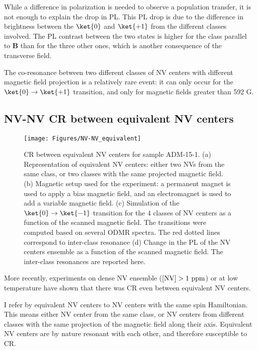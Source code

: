 \documentclass[a4paper,11pt]{report}
\begin{document}
While a difference in polarization is needed to observe a population transfer, it is not enough to explain the drop in PL. This PL drop is due to the difference in brightness between the $\ket{0}$ and $\ket{+1}$ from the different classes involved. The PL contrast between the two states is higher for the class parallel to $\mathbf{B}$ than for the three other ones, which is another consequence of the transverse field.

The co-resonance between two different classes of NV centers with different magnetic field projection is a relatively rare event: it can only occur for the $\ket{0} \to \ket{+1}$ transition, and only for magnetic fields greater than 592 G.


\subsection{NV-NV CR between equivalent NV centers}

\begin{figure}[h]
\centering
\texttt{[image: Figures/NV-NV\_equivalent]}
\caption{CR between equivalent NV centers for sample ADM-15-1. (a) Representation of equivalent NV centers: either two NVs from the same class, or two classes with the same projected magnetic field. (b) Magnetic setup used for the experiment: a permanent magnet is used to apply a bias magnetic field, and an electromagnet is used to add a variable magnetic field. (c) Simulation of the $\ket{0}\to\ket{-1}$ transition for the 4 classes of NV centers as a function of the scanned magnetic field. The transitions were computed based on several ODMR spectra. The red dotted lines correspond to inter-class resonance (d) Change in the PL of the NV centers ensemble as a function of the scanned magnetic field. The inter-class resonances are reported here.}
\label{equivalent NV-NV}
\end{figure}

More recently, experiments \citep{jarmola2012temperature, mrozek2015longitudinal, choi2017depolarization} on dense NV ensemble ($[\rm NV ] >1\ \rm ppm$) or at low temperature have shown that there was CR even between equivalent NV centers.

I refer by equivalent NV centers to NV centers with the same spin Hamiltonian. This means either NV center from the same class, or NV centers from different classes with the same projection of the magnetic field along their axis. Equivalent NV centers are by nature resonant with each other, and therefore susceptible to CR.
\end{document}
